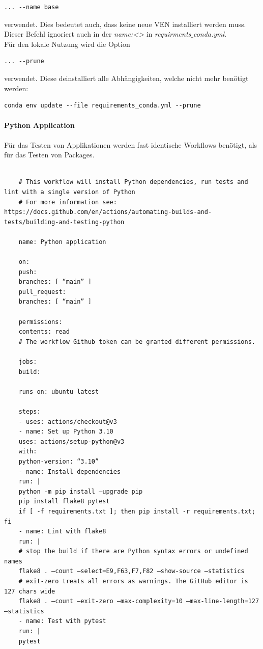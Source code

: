 \begin{lstlisting}[style=CMD, caption={conda update option}, captionpos=b]
	... --name base
\end{lstlisting}
verwendet. Dies bedeutet auch, dass keine neue \gls{VEN} installiert werden muss. Dieser Befehl ignoriert auch in der \textit{name:<>} in \textit{requirments}$\_$\textit{conda.yml}.\\

Für den lokale Nutzung wird die Option

\begin{lstlisting}[style=CMD, caption={conda prune option}, captionpos=b]
	... --prune
\end{lstlisting}
verwendet. Diese deinstalliert alle Abhängigkeiten, welche nicht mehr benötigt werden:

\begin{lstlisting}[style=CMD, caption={Gesamthafter Befehl für lokalen Gebrauch}, captionpos=b]
	conda env update --file requirements_conda.yml --prune
\end{lstlisting}

\paragraph{Python Application}
Für das Testen von Applikationen werden fast identische Workflows benötigt, als für das Testen von Packages.
\begin{lstlisting}[style=Config, caption={GitHub Action Temple: Python Package create and test with conda}, captionpos=b]
	
	# This workflow will install Python dependencies, run tests and lint with a single version of Python
	# For more information see: https://docs.github.com/en/actions/automating-builds-and-tests/building-and-testing-python
	
	name: Python application
	
	on:
	push:
	branches: [ “main” ]
	pull_request:
	branches: [ “main” ]
	
	permissions:
	contents: read
	# The workflow Github token can be granted different permissions.
	
	jobs:
	build:
	
	runs-on: ubuntu-latest
	
	steps:
	- uses: actions/checkout@v3
	- name: Set up Python 3.10
	uses: actions/setup-python@v3
	with:
	python-version: “3.10”
	- name: Install dependencies
	run: |
	python -m pip install —upgrade pip
	pip install flake8 pytest
	if [ -f requirements.txt ]; then pip install -r requirements.txt; fi
	- name: Lint with flake8
	run: |
	# stop the build if there are Python syntax errors or undefined names
	flake8 . —count —select=E9,F63,F7,F82 —show-source —statistics
	# exit-zero treats all errors as warnings. The GitHub editor is 127 chars wide
	flake8 . —count —exit-zero —max-complexity=10 —max-line-length=127 —statistics
	- name: Test with pytest
	run: |
	pytest
\end{lstlisting}


